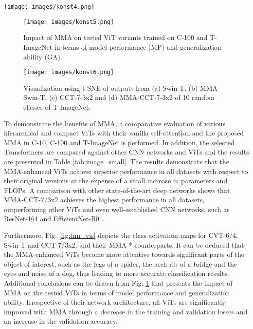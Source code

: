 \documentclass[10pt,twocolumn,letterpaper]{article}
\begin{document}
\begin{figure*}[t]
  \centering
  \texttt{[image: images/konst4.png]}
  \caption{Class activations in T-ImageNet. (a) Original images and class activation maps using (b) CVT-6/4, (c) MMA-CVT-6/4, (d) Swin-T, (e) MMA-Swin-T, (f) CCT-7-3x2 and (g) MMA-CCT-7-3x2 models.}
  \label{fig:tim_vis}
\end{figure*}

\begin{figure}[t]
  \centering
  \texttt{[image: images/konst5.png]}
  \caption{Impact of MMA on tested ViT variants trained on C-100 and T-ImageNet in terms of model performance (MP) and generalization ability (GA).}
  \label{fig:performance}
\end{figure}

\begin{figure}[t]
  \centering
  \texttt{[image: images/konst6.png]}
  \caption{Visualization using t-SNE of outputs from (a) Swin-T, (b) MMA-Swin-T, (c) CCT-7-3x2 and (d) MMA-CCT-7-3x2 of 10 random classes of T-ImageNet.}
  \label{fig:tim_tsne}
\end{figure}

To demonstrate the benefits of MMA, a comparative evaluation of various hierarchical and compact ViTs with their vanilla self-attention and the proposed MMA in C-10, C-100 and T-ImageNet is performed. In addition, the selected Transformers are compared against other CNN networks and ViTs and the results are presented in Table \ref{tab:image_small}. The results demonstrate that the MMA-enhanced ViTs achieve superior performance in all datasets with respect to their original versions at the expense of a small increase in parameters and FLOPs. A comparison with other state-of-the-art deep networks shows that MMA-CCT-7/3x2 achieves the highest performance in all datasets, outperforming other ViTs and even well-established CNN networks, such as ResNet-164 \cite{Author37} and EfficientNet-B0 \cite{Author39}.

Furthermore, Fig. \ref{fig:tim_vis} depicts the class activation maps for CVT-6/4, Swin-T and CCT-7/3x2, and their MMA-* counterparts. It can be deduced that the MMA-enhanced ViTs become more attentive towards significant parts of the object of interest, such as the legs of a spider, the arch rib of a bridge and the eyes and noise of a dog, thus leading to more accurate classification results. Additional conclusions can be drawn from Fig. \ref{fig:performance} that presents the impact of MMA on the tested ViTs in terms of model performance and generalization ability. Irrespective of their network architecture, all ViTs are significantly improved with MMA through a decrease in the training and validation losses and an increase in the validation accuracy.
\end{document}
